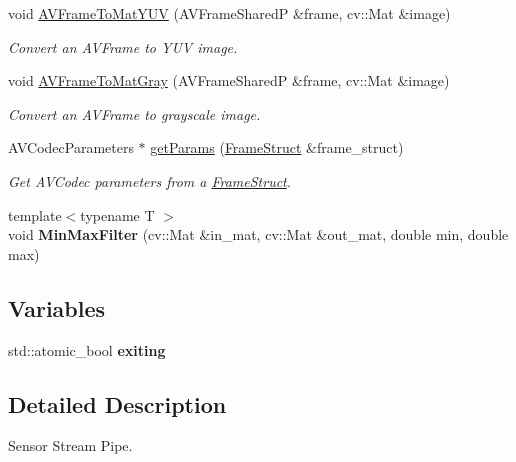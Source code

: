 \begin{DoxyCompactItemize}
void \hyperlink{namespacemoetsi_1_1ssp_a82e9b74b4a9a35255cc5d4ff66dc776f}{A\+V\+Frame\+To\+Mat\+Y\+UV} (A\+V\+Frame\+SharedP \&frame, cv\+::\+Mat \&image)
\begin{DoxyCompactList}\small\item\em Convert an A\+V\+Frame to Y\+UV image. \end{DoxyCompactList}\item 
void \hyperlink{namespacemoetsi_1_1ssp_a028ac1fd9c21f63f40dfa1131c589ad5}{A\+V\+Frame\+To\+Mat\+Gray} (A\+V\+Frame\+SharedP \&frame, cv\+::\+Mat \&image)
\begin{DoxyCompactList}\small\item\em Convert an A\+V\+Frame to grayscale image. \end{DoxyCompactList}\item 
A\+V\+Codec\+Parameters $\ast$ \hyperlink{namespacemoetsi_1_1ssp_a2d7925d2be7b96068b314ec08c673df6}{get\+Params} (\hyperlink{structmoetsi_1_1ssp_1_1FrameStruct}{Frame\+Struct} \&frame\+\_\+struct)
\begin{DoxyCompactList}\small\item\em Get A\+V\+Codec parameters from a \hyperlink{structmoetsi_1_1ssp_1_1FrameStruct}{Frame\+Struct}. \end{DoxyCompactList}\item 
\mbox{\label{namespacemoetsi_1_1ssp_ac6e1b3e0caadb02f6e5a8387e6fee988}} 
{\footnotesize template$<$typename T $>$ }\\void {\bfseries Min\+Max\+Filter} (cv\+::\+Mat \&in\+\_\+mat, cv\+::\+Mat \&out\+\_\+mat, double min, double max)
\end{DoxyCompactItemize}
\subsection*{Variables}
\begin{DoxyCompactItemize}
\item 
\mbox{\label{namespacemoetsi_1_1ssp_a998f3ec3680c51d19383e0f6e38e48c2}} 
std\+::atomic\+\_\+bool {\bfseries exiting}
\end{DoxyCompactItemize}


\subsection{Detailed Description}
Sensor Stream Pipe. 

